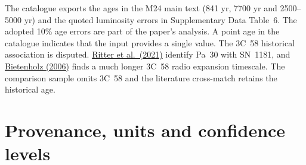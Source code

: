 \documentclass[11pt,a4paper]{article}
\begin{document}
The catalogue exports the ages in the M24 main text (841 yr, 7700 yr and 2500--5000 yr) and the quoted luminosity errors in Supplementary Data Table~6. The adopted 10\% age errors are part of the paper's analysis. A point age in the catalogue indicates that the input provides a single value. The 3C~58 historical association is disputed. \href{https://doi.org/10.3847/2041-8213/ac2253}{Ritter et al.\ (2021)} identify Pa~30 with SN~1181, and \href{https://doi.org/10.1086/504584}{Bietenholz (2006)} finds a much longer 3C~58 radio expansion timescale. The comparison sample omits 3C~58 and the literature cross-match retains the historical age.

\section{Provenance, units and confidence levels}
\end{document}
